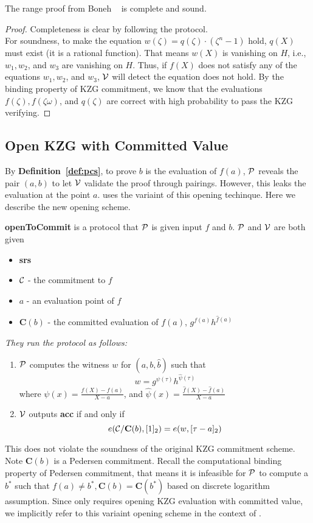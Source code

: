 \begin{lemma}
\label{lemma:range}
The range proof from Boneh \etal~\cite{rangeproof} is complete and sound.
\end{lemma}

\begin{proof}
Completeness is clear by following the protocol. \\
For soundness, to make the equation $w(\zeta)=q(\zeta)\cdot(\zeta^n-1)$ hold, $q(X)$ must exist (it is a rational function). That means $w(X)$ is vanishing on $H$, i.e., $w_1,w_2$, and $w_3$ are vanishing on $H$. Thus, if $f(X)$ does not satisfy any of the equations $w_1,w_2$, and $w_3$, $\mathcal{V}$ will detect the equation does not hold. By the binding property of KZG commitment, we know that the evaluations $f(\zeta),f(\zeta\omega)$, and $q(\zeta)$ are correct with high probability to pass the KZG verifying.
\end{proof}

\subsection{Open KZG with Committed Value}
By \textbf{Definition~\ref{def:pcs}}, to prove $b$ is the evaluation of $f(a)$, $\mathcal{P}$ reveals the pair $(a,b)$ to let $\mathcal{V}$ validate the proof through pairings. However, this leaks the evaluation at the point $a$. \bootstrap uses the variaint of this opening techinque. Here we describe the new opening scheme.
\begin{lemma}
\label{sec:kzgOpenComm}
\textbf{openToCommit} is a protocol that $\mathcal{P}$ is given input $f$ and $b$. $\mathcal{P}$ and $\mathcal{V}$ are both given
\begin{itemize}
    \item \textbf{srs}
    \item $\mathcal{C}$ - the commitment to $f$
    \item $a$ - an evaluation point of $f$
    \item $\textbf{C}(b)$ - the committed evaluation of $f(a)$, $g^{f(a)}h^{\hat{f}(a)}$
\end{itemize}
\textit{They run the protocol as follows:}
\begin{enumerate}
    \item $\mathcal{P}$ computes the witness $w$ for $(a,b,\hat{b})$ such that
    \[ w=g^{\psi(\tau)}h^{\hat\psi(\tau)} \]
    where $\psi(x)=\frac{f(X)-f(a)}{X-a}$, and $\hat\psi(x)=\frac{\hat{f}(X)-\hat{f}(a)}{X-a}$
    \item $\mathcal{V}$ outputs \textbf{acc} if and only if
    \[ e(\mathcal{C}/\textbf{C}(b),[1]_2)=e(w,[\tau-a]_2) \]
\end{enumerate}
\end{lemma}
This does not violate the soundness of the original KZG commitment scheme. Note $\textbf{C}(b)$ is a Pedersen commitment. Recall the computational binding property of Pedersen commitment, that means it is infeasible for $\mathcal{P}$ to compute a $b^*$ such that $f(a)\ne{b^*},\textbf{C}(b)=\textbf{C}(b^*)$ based on discrete logarithm assumption. Since only \bootstrap requires opening KZG evaluation with committed value, we implicitly refer to this variaint opening scheme in the context of \bootstrap.


